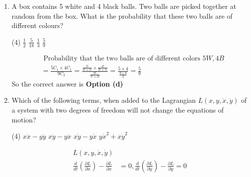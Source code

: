 \begin{enumerate}
 \begin{tasks}(2)
	\task[\textbf{a.}] Positive $y$-direction
	\task[\textbf{b.}] Negative $z$ - direction
	\task[\textbf{c.}]Positive $z$ - direction
	\task[\textbf{d.}]  Negative $y$-direction
\end{tasks}
\begin{answer}
 Initially charged particle will experience electric force and will gain velocity then it will deflect in magnetic field $[\vec{F} \propto(\vec{v} \times B) \rightarrow \hat{y}]$.
 \begin{figure}[H]
 	\centering
 	\texttt{[image: Net-D-19-27]}
 \end{figure}
		So the correct answer is \textbf{Option (a)}
\end{answer}
\item A box contains 5 white and 4 black balls. Two balls are picked together at random from the box. What is the probability that these two balls are of different colours?
 \begin{tasks}(4)
	\task[\textbf{a.}] $\frac{1}{2}$
	\task[\textbf{b.}]$\frac{5}{18}$
	\task[\textbf{c.}]$\frac{1}{3}$
	\task[\textbf{d.}]  $\frac{5}{9}$
\end{tasks}
\begin{answer}
	\begin{align*}
	&\text { Probability that the two balls are of different colors }5 W, 4 B\\
	&=\frac{5 C_{1} \times 4 C_{1}}{9 C_{2}}=\frac{\frac{5 !}{4 ! \times 1 !} \times \frac{4 !}{3 ! \times 1 !}}{\frac{9 !}{7 ! \times 2 !}}=\frac{5 \times 4}{\frac{9 \times 8}{2}}=\frac{5}{9}
	\end{align*}
		So the correct answer is \textbf{Option (d)}
\end{answer}
\item Which of the following terms, when added to the Lagrangian $L(x, y, \dot{x}, \dot{y})$ of a system with two degrees of freedom will not change the equations of motion?
 \begin{tasks}(4)
	\task[\textbf{a.}]$x \ddot{x}-y \ddot{y}$
	\task[\textbf{b.}]$x \ddot{y}-y \ddot{x}$
	\task[\textbf{c.}]$x \dot{y}-y \dot{x}$
	\task[\textbf{d.}] $y \dot{x}^{2}+x \dot{y}^{2}$
\end{tasks}
\begin{answer}
	\begin{align*}
	L(x, y, \dot{x}, \dot{y})&\\
	\frac{d}{d t}\left(\frac{\partial L}{\partial \dot{x}}\right)-\frac{\partial L}{\partial x}&=0, \frac{d}{d t}\left(\frac{\partial L}{\partial \dot{y}}\right)-\frac{\partial L}{\partial y}=0 \\

\end{align*}
\end{answer}
\end{enumerate}
